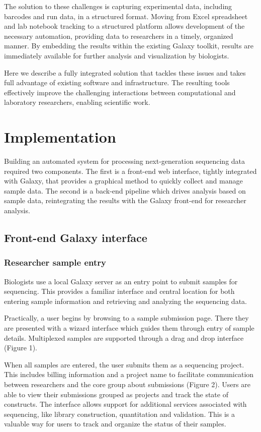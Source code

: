 \documentclass[10pt]{bmc_article}
\newenvironment{bmcformat}{\begin{raggedright}\baselineskip20pt\sloppy\setboolean{publ}{false}}{\end{raggedright}\baselineskip20pt\sloppy}
\begin{document}
\begin{bmcformat}
The solution to these challenges is capturing experimental data,
including barcodes and run data, in a structured format. Moving from
Excel spreadsheet and lab notebook tracking to a structured
platform allows development of the necessary automation, providing
data to researchers in a timely, organized manner. By embedding the
results within the existing Galaxy toolkit, results are immediately
available for further analysis and visualization by biologists.

Here we describe a fully integrated solution that tackles these
issues and takes full advantage of existing software and
infrastructure. The resulting tools effectively improve the
challenging interactions between computational and laboratory
researchers, enabling scientific work.

\section*{Implementation}

Building an automated system for processing next-generation sequencing
data required two components. The first is a front-end web interface,
tightly integrated with Galaxy, that provides a graphical method to
quickly collect and manage sample data. The second is a back-end
pipeline which drives analysis based on sample data, reintegrating
the results with the Galaxy front-end for researcher analysis.

\subsection*{Front-end Galaxy interface}

\subsubsection*{Researcher sample entry}

Biologists use a local Galaxy server as an entry point to submit
samples for sequencing. This provides a familiar interface and central
location for both entering sample information and retrieving and
analyzing the sequencing data.

Practically, a user begins by browsing to a sample submission
page. There they are presented with a wizard interface which guides
them through entry of sample details. Multiplexed samples are
supported through a drag and drop interface (Figure 1).

When all samples are entered, the user submits them as a sequencing
project. This includes billing information and a project name to
facilitate communication between researchers and the core group
about submissions (Figure 2). Users are able to view their submissions
grouped as projects and track the state of constructs. The interface
allows support for additional services associated with sequencing,
like library construction, quantitation and validation. This is a
valuable way for users to track and organize the status of their
samples.


\end{bmcformat}
\end{document}
